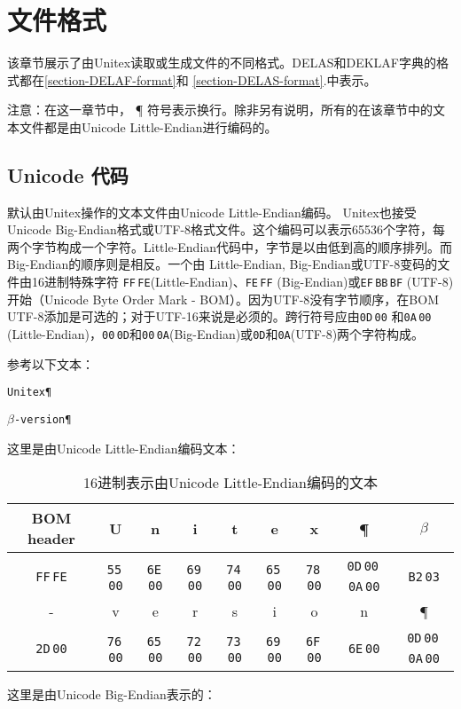 \chapter{文件格式}
\label{chap-file-formats}
该章节展示了由Unitex读取或生成文件的不同格式。DELAS和DEKLAF字典的格式都在\ref{section-DELAF-format}和 \ref{section-DELAS-format}.中表示。

\bigskip
\noindent 
注意：在这一章节中， ¶ 符号表示换行。除非另有说明，所有的在该章节中的文本文件都是由Unicode Little-Endian进行编码的。


\section{Unicode 代码}
\label{unicode-encoding}
默认由Unitex操作的文本文件由Unicode Little-Endian编码。
Unitex也接受Unicode Big-Endian格式或UTF-8格式文件。这个编码可以表示65536个字符，每两个字节构成一个字符。Little-Endian代码中，字节是以由低到高的顺序排列。而Big-Endian的顺序则是相反。一个由 Little-Endian, Big-Endian或UTF-8变码的文件由16进制特殊字符 \verb+FF+\,\verb+FE+(Little-Endian)、\verb+FE+\,\verb+FF+ (Big-Endian)或\verb+EF+\,\verb+BB+\,\verb+BF+ (UTF-8)开始（Unicode Byte Order Mark - BOM）。因为UTF-8没有字节顺序，在BOM UTF-8添加是可选的；对于UTF-16来说是必须的。跨行符号应由\verb+0D+\,\verb+00+ 和\verb+0A+\,\verb+00+ (Little-Endian)，\verb+00+\,\verb+0D+和\verb+00+\,\verb+0A+(Big-Endian)或\verb+0D+和\verb+0A+(UTF-8)两个字符构成。

\bigskip
\noindent 
参考以下文本：


\bigskip
\texttt{Unitex\P}

\texttt{$\beta$-version\P}

\bigskip
\noindent
这里是由Unicode Little-Endian编码文本：

\bigskip
\begin{table}[!h]
\begin{center}
\begin{tabular}{|c|c|c|c|c|c|c|c|c|}
\hline
BOM header & U & n & i & t & e & x & \P & $\beta$
\\
\hline
\verb+FF+\,\verb+FE+ & \verb+55+\,\verb+00+ & \verb+6E+\,\verb+00+ & \verb+69+\,\verb+00+ & \verb+74+\,\verb+00+ & \verb+65+\,\verb+00+ & \verb+78+\,\verb+00+
& \verb+0D+\,\verb+00+\,\verb+0A+\,\verb+00+ & \verb+B2+\,\verb+03+
\\
\hline
\hline
- & v & e & r & s & i & o & n & \P
\\
\hline
\verb+2D+\,\verb+00+ & \verb+76+\,\verb+00+ & \verb+65+\,\verb+00+ & \verb+72+\,\verb+00+ & \verb+73+\,\verb+00+ & \verb+69+\,\verb+00+ & \verb+6F+\,\verb+00+
& \verb+6E+\,\verb+00+ & \verb+0D+\,\verb+00+\,\verb+0A+\,\verb+00+
\\
\hline
\end{tabular}
\caption{16进制表示由Unicode Little-Endian编码的文本}
\end{center}
\end{table}
\pagebreak
\bigskip
\noindent
这里是由Unicode Big-Endian表示的：

